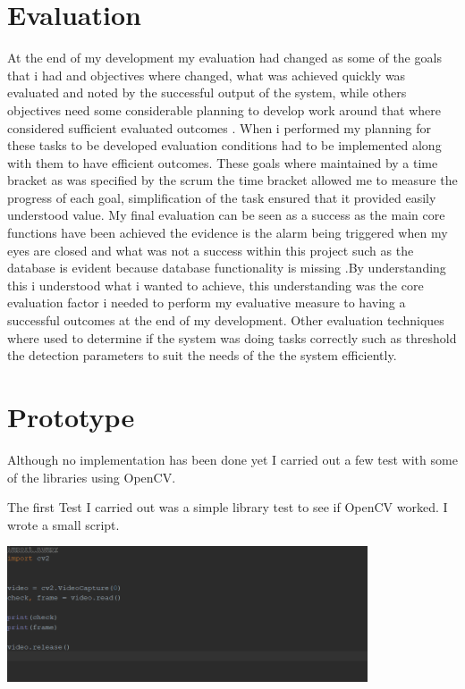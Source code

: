 \section{Evaluation }
 At the end of my development my evaluation had changed as  some of the goals that i had and objectives where changed, what was achieved  quickly was evaluated and noted by the successful output of the system, while others objectives need  some considerable  planning to develop work around that where considered sufficient  evaluated outcomes .  When  i performed my planning  for these tasks to be developed evaluation conditions had to be implemented along with them to have efficient outcomes. These goals where maintained by a time bracket as was specified  by the scrum the time bracket allowed me to measure the progress of each goal, simplification of the task ensured that it provided easily understood value. My final evaluation can be seen as a success as the main core functions have been achieved the evidence is the alarm being triggered when my eyes are closed and what was  not  a success within this project such as  the database  is evident because database functionality is missing .By understanding this i understood what i wanted to  achieve, this understanding was the core  evaluation factor i needed to perform my evaluative measure to having a successful outcomes at the end of my development. Other evaluation techniques where used to determine if the system was doing tasks correctly such as threshold the detection  parameters to suit the needs of the the system efficiently.


\section{Prototype}
Although no implementation has been done yet I carried out a few test with some of the libraries using OpenCV.

The first Test I carried out was a simple library test to see if OpenCV worked. I wrote a small script.

\includegraphics[width=0.8\textwidth]{Figures/Pythonscript.png}

